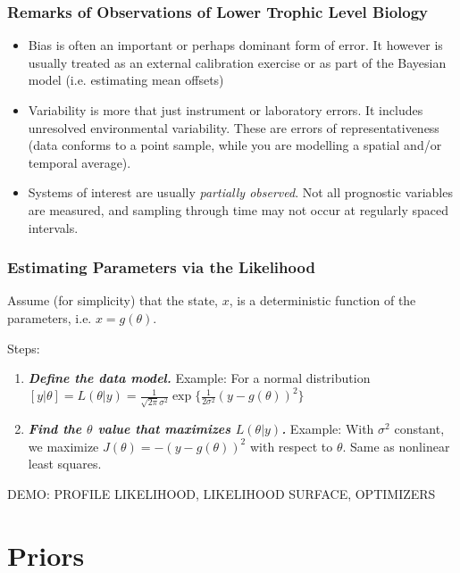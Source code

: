 \documentclass{beamer}
\renewcommand{\bf}{\bfseries}
\begin{document}
\frame%
{\frametitle{Remarks of Observations of Lower Trophic Level Biology}

\begin{itemize}
\item
Bias is often an important or perhaps dominant form of error. It however is usually treated as an external calibration exercise or as part of the Bayesian model (i.e. estimating mean offsets)
\item
Variability is more that just instrument or laboratory errors. It includes unresolved environmental variability. These are errors of representativeness (data conforms to a point sample, while you are modelling a spatial and/or temporal average). 
\item
Systems of interest are usually {\it partially observed}. Not all prognostic variables are measured, and sampling through time may not occur at regularly spaced intervals.
\end{itemize}
}

\frame%
{\frametitle{Estimating Parameters via the Likelihood}

Assume (for simplicity) that the state, $x$, is a deterministic function of the parameters, i.e. $x = g(\theta)$.

Steps:
\medskip
\begin{enumerate}

\item
{\it \bf Define the data model.} Example: For a normal distribution $[y | \theta] = L(\theta | y) = \frac{1}{\sqrt{2 \pi} \sigma^2} \exp \{ \frac{1}{2 \sigma^2} \left( y - g(\theta) \right)^2 \}$

\item
{\it \bf Find the $\theta$ value that maximizes $L(\theta | y)$.}  Example: With $\sigma^2$ constant,  we maximize  $ J (\theta) = -\left( y - g(\theta) \right)^2$ with respect to $\theta$. Same as nonlinear least squares. 

\end{enumerate}

\medskip
\color{red} DEMO: PROFILE LIKELIHOOD, LIKELIHOOD SURFACE, OPTIMIZERS

}

\section{Priors}
\end{document}
